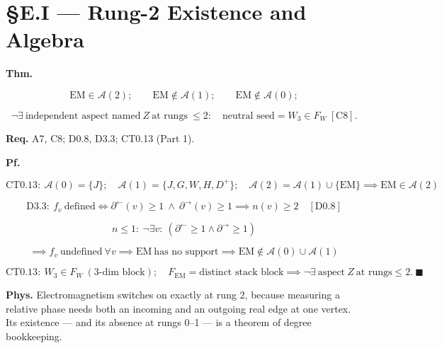 \section[§E.I — Rung-2 Existence and Algebra]{\texorpdfstring{§E.I — Rung-2 Existence and Algebra}{SE.I - Rung-2 Existence and Algebra}}

\begin{theorem}\label{tag:EM-1}
\textbf{Thm.}

\[
\mathrm{EM}\in\mathcal A(2);\qquad\mathrm{EM}\notin\mathcal A(1);\qquad\mathrm{EM}\notin\mathcal A(0);
\]

\[
\neg\exists\ \text{independent aspect named}\ Z\ \text{at rungs}\ \le2:\quad\text{neutral seed}=W_3\in F_W\ [\mathrm{C8}].
\]

\textbf{Req.} A7, C8; D0.8, D3.3; CT0.13 (Part 1).

\textbf{Pf.}

\[
\mathrm{CT0.13}:\ \mathcal A(0)=\{J\};\quad\mathcal A(1)=\{J,G,W,H,D^+\};\quad\mathcal A(2)=\mathcal A(1)\cup\{\mathrm{EM}\}\implies\mathrm{EM}\in\mathcal A(2)
\]

\[
\mathrm{D3.3}:\ f_v\ \text{defined}\iff\partial^{\leftarrow}(v)\ge1\ \wedge\ \partial^{\rightarrow}(v)\ge1\implies n(v)\ge2\quad[\mathrm{D0.8}]
\]

\[
n \le 1:\ \neg\exists v:\ (\partial^{\leftarrow}\ge1\wedge\partial^{\rightarrow}\ge1)
\]

\[
\implies f_v\ \text{undefined}\ \forall v\implies\mathrm{EM}\ \text{has no support}\implies\mathrm{EM}\notin\mathcal A(0)\cup\mathcal A(1)
\]

\[
\mathrm{CT0.13}:\ W_3\in F_W\ (3\text{-dim block});\quad F_{\mathrm{EM}}=\text{distinct stack block}\implies\neg\exists\ \text{aspect}\ Z\ \text{at rungs}\le2.\ \blacksquare
\]

\textbf{Phys.} Electromagnetism switches on exactly at rung 2, because measuring a relative phase needs both an incoming and an outgoing real edge at one vertex. Its existence — and its absence at rungs 0–1 — is a theorem of degree bookkeeping.

\end{theorem}

